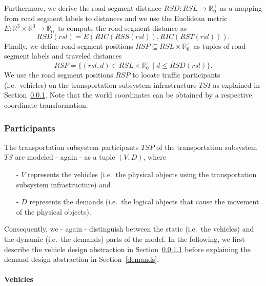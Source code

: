 Furthermore, we derive the road segment distance $RSD: RSL \rightarrow \mathbb{R}_0^+$ as a mapping from road segment labels to distances and we use the Euclidean metric $E: \mathbb{R}^3 \times \mathbb{R}^3 \rightarrow \mathbb{R}_0^+$ to compute the road segment distance as
\[
	RSD(rsl) = E(RIC(RSS(rsl)), RIC(RST(rsl))) \textrm{.}
\]
Finally, we define road segment positions $RSP \subseteq RSL \times \mathbb{R}_0^+$ as tuples of road segment labels and traveled distances
\[
	RSP = \{(rsl, d) \in RSL \times \mathbb{R}_0^+ \mid d \leq RSD(rsl)\} \textrm{.}
\]
We use the road segment positions $RSP$ to locate traffic participants (i.e.\ vehicles) on the transportation subsystem infrastructure $TSI$ as explained in Section~\ref{participants}. Note that the world coordinates can be obtained by a respective coordinate transformation.

\subsubsection{Participants}
\label{participants}

The transportation subsystem participants $TSP$ of the transportation subsystem $TS$ are modeled - again - as a tuple $(V, D)$, where
\begin{itemize}
	\item[-] $V$ represents the vehicles (i.e.\ the physical objects using the transportation subsystem infrastructure) and
	\item[-] $D$ represents the demands (i.e.\ the logical objects that cause the movement of the physical objects).
\end{itemize}
Consequently, we - again - distinguish between the static (i.e.\ the vehicles) and the dynamic (i.e.\ the demands) parts of the model. In the following, we first describe the vehicle design abstraction in Section~\ref{vehicles} before explaining the demand design abstraction in Section~\ref{demands}.

\paragraph{Vehicles}
\label{vehicles}

